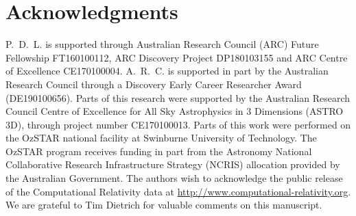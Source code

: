 \documentclass[../Thesis.tex]{subfiles}
\begin{document}
\section{Acknowledgments}
        P.~D.~L. is supported through Australian Research Council (ARC) Future Fellowship FT160100112,  ARC Discovery Project DP180103155 and  ARC Centre of Excellence CE170100004. A.~R.~C. is supported in part by the Australian Research Council through a Discovery Early Career Researcher Award (DE190100656). Parts of this research were supported by the Australian Research Council Centre of Excellence for All Sky Astrophysics in 3 Dimensions (ASTRO 3D), through project number CE170100013. Parts of this work were performed on the OzSTAR national facility at Swinburne University of Technology. The OzSTAR program receives funding in part from the Astronomy National Collaborative Research Infrastructure Strategy (NCRIS) allocation provided by the Australian Government. The authors wish to acknowledge the public release of the Computational Relativity data at \url{http://www.computational-relativity.org}. We are grateful to Tim Dietrich for valuable comments on this manuscript.
% 
\end{document}
